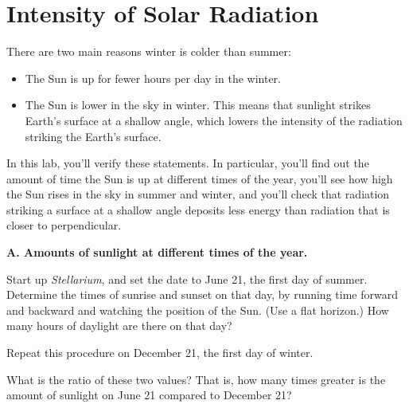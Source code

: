 

\section{Intensity of Solar Radiation}

\makelabheader

\bigskip
There are two main reasons winter is colder than summer:
\begin{itemize}
\item The Sun is up for fewer hours per day in the winter.
\item The Sun is lower in the sky in winter.  This means
that sunlight strikes Earth's surface at a shallow
angle, which lowers the intensity
of the radiation striking the Earth's surface.
\end{itemize}

In this lab, you'll verify these statements. In particular,
you'll find out the amount of time the Sun is up at different
times of the year,
you'll see how high the Sun rises in the sky in summer and winter,
and you'll check that radiation striking a surface at
a shallow angle deposits less energy than radiation that is
closer to perpendicular.

\bigskip

{\bf A. Amounts of sunlight at different times of the year.} 

Start up \textit{Stellarium}, and set the date to June 21, the 
first day of summer. Determine the times of sunrise and sunset on that
day, by running time forward and backward and watching the position of the Sun.
(Use a flat horizon.)
How many hours of daylight are there on that day?

\answerspace{1in}

Repeat this procedure on December 21, the first day of winter.

\answerspace{1in}

What is the ratio of these two values? That is, how many times
greater is the amount of sunlight on June 21 compared to December 21?

\answerspace{1in}

